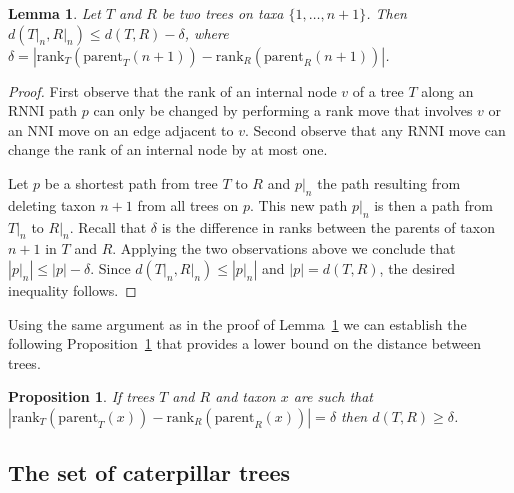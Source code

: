 \documentclass{amsart}
\newcommand{\parent}{\mathrm{parent}}
\newcommand{\rank}{\mathrm{rank}}
\newcommand{\nni}{\mathrm{NNI}}
\newcommand{\rnni}{\mathrm{RNNI}}
\newtheorem{lemma}[definition]{Lemma}
\newtheorem{proposition}[definition]{Proposition}
\begin{document}
\begin{lemma}
Let $T$ and $R$ be two trees on taxa $\{1, \ldots, n+1\}$.
Then $d(T{\big|}_n, R{\big|}_n) \leq d(T,R) - \delta$, where $\delta = |\rank_T(\parent_T(n+1)) - \rank_R(\parent_R(n+1))|$.
\label{lemma:distance_delete_taxon}
\end{lemma}

\begin{proof}
First observe that the rank of an internal node $v$ of a tree $T$ along an $\rnni$ path $p$ can only be changed by performing a rank move that involves $v$ or an $\nni$ move on an edge adjacent to $v$.
Second observe that any $\rnni$ move can change the rank of an internal node by at most one.

Let $p$ be a shortest path from tree $T$ to $R$ and $p{\big|}_n$ the path resulting from deleting taxon $n+1$ from all trees on $p$.
This new path $p{\big|}_n$ is then a path from $T{\big|}_n$ to $R{\big|}_n$.
Recall that $\delta$ is the difference in ranks between the parents of taxon $n+1$ in $T$ and $R$.
Applying the two observations above we conclude that $|p{\big|}_n| \leq |p| - \delta$.
Since $d(T{\big|}_n,R{\big|}_n) \leq |p{\big|}_n|$ and $|p| = d(T,R)$, the desired inequality follows.
\end{proof}

Using the same argument as in the proof of Lemma~\ref{lemma:distance_delete_taxon} we can establish the following Proposition~\ref{proposition:lower_bound_distance} that provides a lower bound on the distance between trees.

\begin{proposition}
If trees $T$ and $R$ and taxon $x$ are such that $|\rank_T(\parent_T(x)) - \rank_R(\parent_R(x))| = \delta$ then $d(T,R) \geq \delta$.
\label{proposition:lower_bound_distance}
\end{proposition}


\subsection{The set of caterpillar trees}
\label{section:caterpillar_convex}
\end{document}

